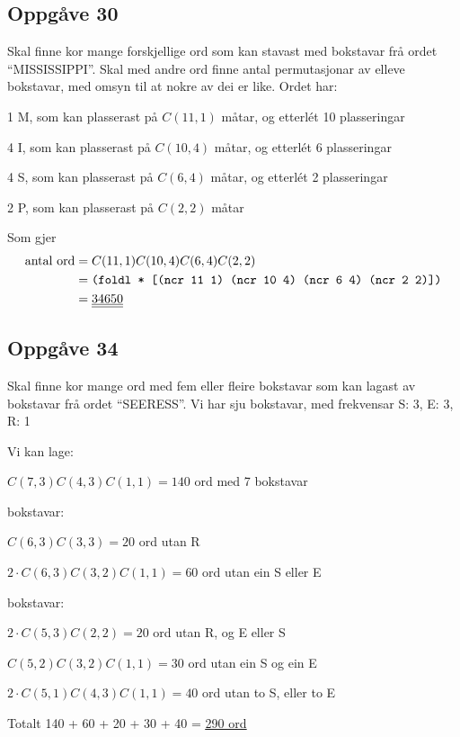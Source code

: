 \documentclass[a4paper, 11pt]{article}
\def\dul#1{\underline{\underline{#1}}}
\begin{document}
\newpage
\subsection*{Oppgåve 30}
Skal finne kor mange forskjellige ord som kan stavast med bokstavar frå ordet {``MISSISSIPPI''}.
Skal med andre ord finne antal permutasjonar av elleve bokstavar, med omsyn til at nokre av dei er like.
Ordet har:

1 M, som kan plasserast på \(C(11,1)\) måtar, og etterlét 10 plasseringar

4 I, som kan plasserast på \(C(10,4)\) måtar, og etterlét 6 plasseringar

4 S, som kan plasserast på \(C(6, 4)\) måtar, og etterlét 2 plasseringar

2 P, som kan plasserast på \(C(2, 2)\) måtar

\noindent Som gjer
\begin{align*}
    \text{antal ord}&= C(11,1)C(10,4)C(6,4)C(2,2)  \\
    &= \text{\tt (foldl * [(ncr 11 1) (ncr 10 4) (ncr 6 4) (ncr 2 2)])} \\
    &= \dul{34650}
\end{align*}


\subsection*{Oppgåve 34}
Skal finne kor mange ord med fem eller fleire bokstavar som kan lagast av bokstavar frå ordet ``SEERESS''.
Vi har sju bokstavar, med frekvensar S: 3, E: 3, R: 1

\vspace{3mm}
\noindent Vi kan lage:

\(C(7,3)C(4,3)C(1,1) = 140\) ord med 7 bokstavar

 bokstavar:

\(C(6,3)C(3,3) = 20\) ord utan R

\(2 \cdot C(6,3)C(3,2)C(1,1) = 60\) ord utan ein S eller E

 bokstavar:

\(2 \cdot C(5,3)C(2,2) = 20\) ord utan R, og E eller S

\(C(5,2)C(3,2)C(1,1) = 30\) ord utan ein S og ein E

\(2 \cdot C(5,1)C(4,3)C(1,1) = 40\) ord utan to S, eller to E

\vspace{3mm}
\noindent Totalt 140 + 60 + 20 + 30 + 40 = \dul{290 ord}
\end{document}
